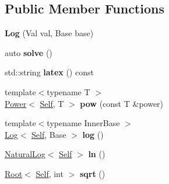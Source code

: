 \subsection*{Public Member Functions}
\begin{DoxyCompactItemize}
\item 
\hypertarget{classlatex_1_1math_1_1Log_acff6d6f36adff38cf7c0da719516c6bc}{{\bfseries Log} (Val val, Base base)}\label{classlatex_1_1math_1_1Log_acff6d6f36adff38cf7c0da719516c6bc}

\item 
\hypertarget{classlatex_1_1math_1_1Log_a5d9819331208c23d8978a3744d058f14}{auto {\bfseries solve} ()}\label{classlatex_1_1math_1_1Log_a5d9819331208c23d8978a3744d058f14}

\item 
\hypertarget{classlatex_1_1math_1_1Log_a1bc90c91e52e7858e33dcdaba673b7a9}{std\-::string {\bfseries latex} () const }\label{classlatex_1_1math_1_1Log_a1bc90c91e52e7858e33dcdaba673b7a9}

\item 
\hypertarget{classlatex_1_1math_1_1Log_a7f6a21c6100f2c69490aa47766360a2d}{{\footnotesize template$<$typename T $>$ }\\\hyperlink{classlatex_1_1math_1_1Power}{Power}$<$ \hyperlink{classlatex_1_1math_1_1Root}{Self}, T $>$ {\bfseries pow} (const T \&power)}\label{classlatex_1_1math_1_1Log_a7f6a21c6100f2c69490aa47766360a2d}

\item 
\hypertarget{classlatex_1_1math_1_1Log_aacf7a5312839b22b33fcb67ed3f51fde}{{\footnotesize template$<$typename Inner\-Base $>$ }\\\hyperlink{classlatex_1_1math_1_1Log}{Log}$<$ \hyperlink{classlatex_1_1math_1_1Root}{Self}, Base $>$ {\bfseries log} ()}\label{classlatex_1_1math_1_1Log_aacf7a5312839b22b33fcb67ed3f51fde}

\item 
\hypertarget{classlatex_1_1math_1_1Log_a6ae7bf3b1ce862280b67b58f69d5c793}{\hyperlink{classlatex_1_1math_1_1NaturalLog}{Natural\-Log}$<$ \hyperlink{classlatex_1_1math_1_1Root}{Self} $>$ {\bfseries ln} ()}\label{classlatex_1_1math_1_1Log_a6ae7bf3b1ce862280b67b58f69d5c793}

\item 
\hypertarget{classlatex_1_1math_1_1Log_a980f02ee52b6b81f1c7e7ccf75521a67}{\hyperlink{classlatex_1_1math_1_1Root}{Root}$<$ \hyperlink{classlatex_1_1math_1_1Root}{Self}, int $>$ {\bfseries sqrt} ()}\label{classlatex_1_1math_1_1Log_a980f02ee52b6b81f1c7e7ccf75521a67}

\end{DoxyCompactItemize}
